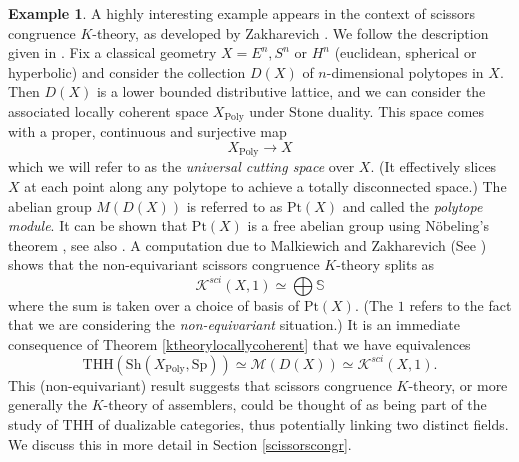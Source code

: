 \documentclass[10pt]{amsart}
\theoremstyle{definition}
\newtheorem{example}[theorem]{Example}
\begin{document}
\begin{example}
A highly interesting example appears in the context of scissors congruence $K$-theory, as developed by Zakharevich \cite{zakharevich2011scissorscongruencektheory}. We follow the description given in \cite{malkiewich2024higherscissorscongruence}. Fix a classical geometry $X = E^n, S^n$ or $H^n$ (euclidean, spherical or hyperbolic) and consider the collection $D(X)$ of $n$-dimensional polytopes in $X$. Then $D(X)$ is a lower bounded distributive lattice, and we can consider the associated locally coherent space $X_{\mathrm{Poly}}$ under Stone duality. This space comes with a proper, continuous and surjective map
$$X_{\mathrm{Poly}} \rightarrow X$$
which we will refer to as the \emph{universal cutting space} over $X$. (It effectively slices $X$ at each point along any polytope to achieve a totally disconnected space.) The abelian group $M(D(X))$ is referred to as $\mathrm{Pt}(X)$ and called the \emph{polytope module}. It can be shown that $\mathrm{Pt}(X)$ is a free abelian group using Nöbeling's theorem \cite{NÖBELING1968/69}, see also \cite{asgeirsson:LIPIcs.ITP.2024.6}. A computation due to Malkiewich and Zakharevich (See \cite[ Theorem 1.10]{malkiewich2024higherscissorscongruence}) shows that the non-equivariant scissors congruence $K$-theory splits as
$$\mathcal{K}^{sci}(X,1) \simeq \bigoplus \mathbb{S}$$
where the sum is taken over a choice of basis of $\mathrm{Pt}(X)$. (The $1$ refers to the fact that we are considering the \emph{non-equivariant} situation.)  It is an immediate consequence of Theorem \ref{ktheorylocallycoherent} that we have equivalences
$$ \mathrm{THH}( \mathrm{Sh}(X_{\mathrm{Poly}},\mathrm{Sp}) ) \simeq \mathcal{M}(D(X)) \simeq \mathcal{K}^{sci}(X,1).$$
This (non-equivariant) result suggests that scissors congruence $K$-theory, or more generally the $K$-theory of assemblers, could be thought of as being part of the study of $\mathrm{THH}$ of dualizable categories, thus potentially linking two distinct fields. We discuss this in more detail in Section \ref{scissorscongr}.
\end{example}
\end{document}
